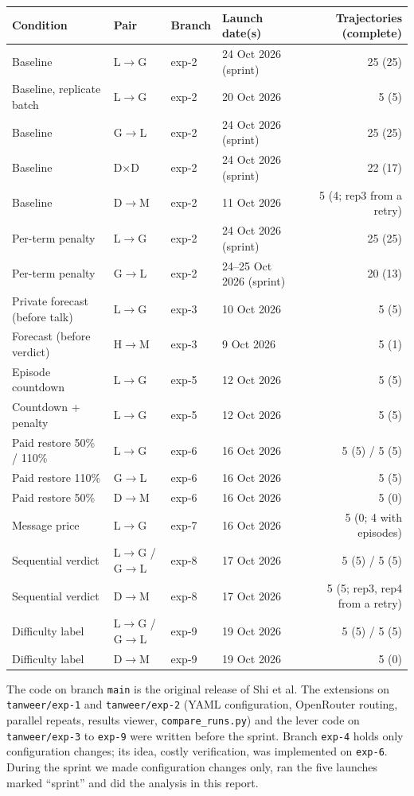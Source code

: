 \documentclass{article}
\begin{document}
\begin{table}[H]
\centering
\scriptsize
\begin{tabular}{@{}llllr@{}}
\toprule
Condition & Pair & Branch & Launch date(s) & Trajectories (complete) \\
\midrule
Baseline & L$\to$G & exp-2 & 24 Oct 2026 (sprint) & 25 (25) \\
Baseline, replicate batch & L$\to$G & exp-2 & 20 Oct 2026 & 5 (5) \\
Baseline & G$\to$L & exp-2 & 24 Oct 2026 (sprint) & 25 (25) \\
Baseline & D$\times$D & exp-2 & 24 Oct 2026 (sprint) & 22 (17) \\
Baseline & D$\to$M & exp-2 & 11 Oct 2026 & 5 (4; rep3 from a retry) \\
Per-term penalty & L$\to$G & exp-2 & 24 Oct 2026 (sprint) & 25 (25) \\
Per-term penalty & G$\to$L & exp-2 & 24--25 Oct 2026 (sprint) & 20 (13) \\
Private forecast (before talk) & L$\to$G & exp-3 & 10 Oct 2026 & 5 (5) \\
Forecast (before verdict) & H$\to$M & exp-3 & 9 Oct 2026 & 5 (1) \\
Episode countdown & L$\to$G & exp-5 & 12 Oct 2026 & 5 (5) \\
Countdown + penalty & L$\to$G & exp-5 & 12 Oct 2026 & 5 (5) \\
Paid restore 50\% / 110\% & L$\to$G & exp-6 & 16 Oct 2026 & 5 (5) / 5 (5) \\
Paid restore 110\% & G$\to$L & exp-6 & 16 Oct 2026 & 5 (5) \\
Paid restore 50\% & D$\to$M & exp-6 & 16 Oct 2026 & 5 (0) \\
Message price & L$\to$G & exp-7 & 16 Oct 2026 & 5 (0; 4 with episodes) \\
Sequential verdict & L$\to$G / G$\to$L & exp-8 & 17 Oct 2026 & 5 (5) / 5 (5) \\
Sequential verdict & D$\to$M & exp-8 & 17 Oct 2026 & 5 (5; rep3, rep4 from a retry) \\
Difficulty label & L$\to$G / G$\to$L & exp-9 & 19 Oct 2026 & 5 (5) / 5 (5) \\
Difficulty label & D$\to$M & exp-9 & 19 Oct 2026 & 5 (0) \\
\bottomrule
\end{tabular}
\end{table}

The code on branch \texttt{main} is the original release of Shi et al. The extensions on \texttt{tanweer/exp-1} and \texttt{tanweer/exp-2} (YAML configuration, OpenRouter routing, parallel repeats, results viewer, \texttt{compare\_runs.py}) and the lever code on \texttt{tanweer/exp-3} to \texttt{exp-9} were written before the sprint. Branch \texttt{exp-4} holds only configuration changes; its idea, costly verification, was implemented on \texttt{exp-6}. During the sprint we made configuration changes only, ran the five launches marked ``sprint'' and did the analysis in this report.
\end{document}
